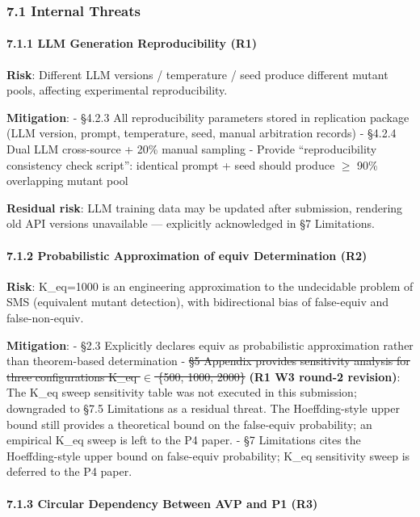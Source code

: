 \documentclass[review,12pt,authoryear]{elsarticle}
\begin{document}
\subsubsection{7.1 Internal Threats}\label{internal-threats}

\paragraph{7.1.1 LLM Generation Reproducibility
(R1)}\label{llm-generation-reproducibility-r1}

\textbf{Risk}: Different LLM versions / temperature / seed produce
different mutant pools, affecting experimental reproducibility.

\textbf{Mitigation}: - §4.2.3 All reproducibility parameters stored in
replication package (LLM version, prompt, temperature, seed, manual
arbitration records) - §4.2.4 Dual LLM cross-source + 20\% manual
sampling - Provide ``reproducibility consistency check script'':
identical prompt + seed should produce $\geq$ 90\% overlapping mutant pool

\textbf{Residual risk}: LLM training data may be updated after
submission, rendering old API versions unavailable --- explicitly
acknowledged in §7 Limitations.

\paragraph{7.1.2 Probabilistic Approximation of equiv Determination
(R2)}\label{probabilistic-approximation-of-equiv-determination-r2}

\textbf{Risk}: K\_eq=1000 is an engineering approximation to the
undecidable problem of SMS (equivalent mutant detection), with
bidirectional bias of false-equiv and false-non-equiv.

\textbf{Mitigation}: - §2.3 Explicitly declares equiv as probabilistic
approximation rather than theorem-based determination - \st{§5 Appendix
provides sensitivity analysis for three configurations K\_eq $\in$ \{500,
1000, 2000\}} \textbf{(R1 W3 round-2 revision)}: The K\_eq sweep
sensitivity table was not executed in this submission; downgraded to
§7.5 Limitations as a residual threat. The Hoeffding-style upper bound
still provides a theoretical bound on the false-equiv probability; an
empirical K\_eq sweep is left to the P4 paper. - §7 Limitations cites
the Hoeffding-style upper bound on false-equiv probability; K\_eq
sensitivity sweep is deferred to the P4 paper.

\paragraph{7.1.3 Circular Dependency Between AVP and P1
(R3)}\label{circular-dependency-between-avp-and-p1-r3}
\end{document}
